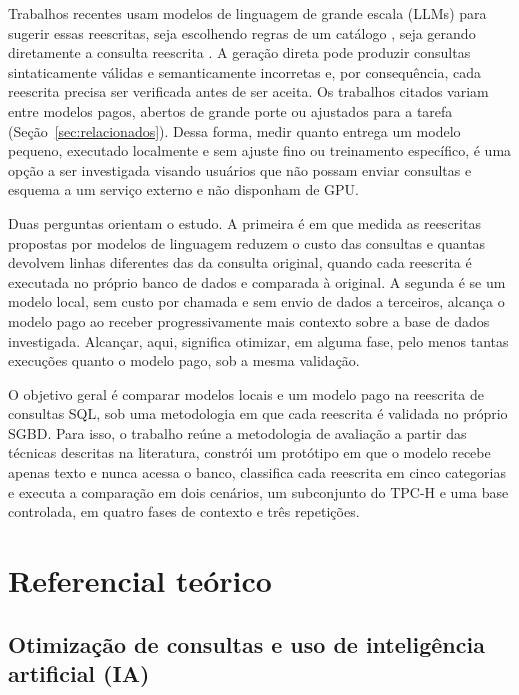 \documentclass[12pt]{article}
\begin{document}
Trabalhos recentes usam modelos de linguagem de grande escala (LLMs) para sugerir essas reescritas, seja escolhendo regras de um catálogo \cite{li2024llmr2,sun2025rbot}, seja gerando diretamente a consulta reescrita \cite{liu2025genrewrite,dharwada2026lithe}. A geração direta pode produzir consultas sintaticamente válidas e semanticamente incorretas \cite{huang2024hallucination} e, por consequência, cada reescrita precisa ser verificada antes de ser aceita. Os trabalhos citados variam entre modelos pagos, abertos de grande porte ou ajustados para a tarefa (Seção~\ref{sec:relacionados}). Dessa forma, medir quanto entrega um modelo pequeno, executado localmente e sem ajuste fino ou treinamento específico, é uma opção a ser investigada visando usuários que não possam enviar consultas e esquema a um serviço externo e não disponham de GPU.

Duas perguntas orientam o estudo. A primeira é em que medida as reescritas propostas por modelos de linguagem reduzem o custo das consultas e quantas devolvem linhas diferentes das da consulta original, quando cada reescrita é executada no próprio banco de dados e comparada à original. A segunda é se um modelo local, sem custo por chamada e sem envio de dados a terceiros, alcança o modelo pago ao receber progressivamente mais contexto sobre a base de dados investigada. Alcançar, aqui, significa otimizar, em alguma fase, pelo menos tantas execuções quanto o modelo pago, sob a mesma validação.

O objetivo geral é comparar modelos locais e um modelo pago na reescrita de consultas SQL, sob uma metodologia em que cada reescrita é validada no próprio SGBD. Para isso, o trabalho reúne a metodologia de avaliação a partir das técnicas descritas na literatura, constrói um protótipo em que o modelo recebe apenas texto e nunca acessa o banco, classifica cada reescrita em cinco categorias e executa a comparação em dois cenários, um subconjunto do TPC-H e uma base controlada, em quatro fases de contexto e três repetições.

\section{Referencial teórico}

\subsection{Otimização de consultas e uso de inteligência artificial (IA)}
\label{sec:otimizacao}
\end{document}
